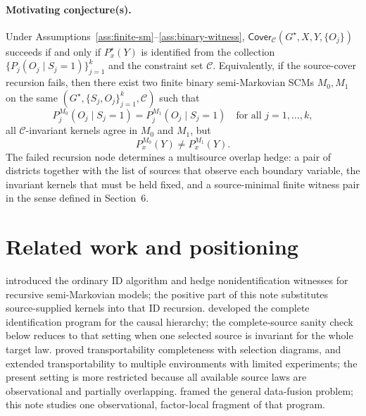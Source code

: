 \documentclass[11pt]{article}
\theoremstyle{definition}
\theoremstyle{plain}
\theoremstyle{remark}
\begin{document}
\paragraph{Motivating conjecture(s).}
\begin{conjecture}\label{conj:overlap-hedge-completeness}
Under Assumptions~\ref{ass:finite-sm}--\ref{ass:binary-witness},
\(\mathsf{Cover}_{\mathcal C}(G^\star,X,Y,\{O_j\})\) succeeds if and only if
\(P^\star_x(Y)\) is identified from the collection
\(\{P_j(O_j\mid S_j=1)\}_{j=1}^k\) and the constraint set \(\mathcal C\).
Equivalently, if the source-cover recursion fails, then there exist two
finite binary semi-Markovian SCMs \(M_0,M_1\) on the same
\((G^\star,\{S_j,O_j\}_{j=1}^k,\mathcal C)\) such that
\[
  P^{M_0}_j(O_j\mid S_j=1)=P^{M_1}_j(O_j\mid S_j=1)
  \quad\text{for all }j=1,\ldots,k,
\]
all \(\mathcal C\)-invariant kernels agree in \(M_0\) and \(M_1\), but
\[
  P^{M_0}_x(Y)\ne P^{M_1}_x(Y).
\]
The failed recursion node determines a multisource overlap hedge: a pair of
districts together with the list of sources that observe each boundary
variable, the invariant kernels that must be held fixed, and a source-minimal
finite witness pair in the sense defined in Section~6.
\end{conjecture}

\section{Related work and positioning}
\cite{ShpitserPearl2006ID} introduced the ordinary ID algorithm and hedge
nonidentification witnesses for recursive semi-Markovian models; the positive
part of this note substitutes source-supplied kernels into that ID recursion.
\cite{ShpitserPearl2008CompleteID} developed the complete identification
program for the causal hierarchy; the complete-source sanity check below
reduces to that setting when one selected source is invariant for the whole
target law.  \cite{BareinboimPearl2012TransportCompleteness} proved
transportability completeness with selection diagrams, and
\cite{BareinboimPearl2014MZTransport} extended transportability to multiple
environments with limited experiments; the present setting is more restricted
because all available source laws are observational and partially overlapping.
\cite{BareinboimPearl2016DataFusion} framed the general data-fusion problem;
this note studies one observational, factor-local fragment of that program.
\end{document}
